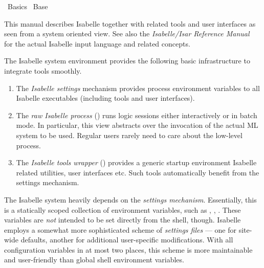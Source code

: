 %
\begin{isabellebody}%
\def\isabellecontext{Basics}%
%
\isadelimtheory
%
\endisadelimtheory
%
\isatagtheory
{}\isamarkupfalse%
\ Basics\isanewline
{}\ Base\isanewline
{}%
\endisatagtheory
{\isafoldtheory}%
%
\isadelimtheory
%
\endisadelimtheory
%
\isamarkuptrue%
%
\begin{isamarkuptext}%
This manual describes Isabelle together with related tools and user
  interfaces as seen from a system oriented view.  See also the
  \emph{Isabelle/Isar Reference Manual}~\cite{isabelle-isar-ref} for
  the actual Isabelle input language and related concepts.

  \medskip The Isabelle system environment provides the following
  basic infrastructure to integrate tools smoothly.

  \begin{enumerate}

  \item The \emph{Isabelle settings} mechanism provides process
  environment variables to all Isabelle executables (including tools
  and user interfaces).

  \item The \emph{raw Isabelle process} (\hyperlink{executable.isabelle-process}{\mbox{}}) runs logic sessions either interactively or in
  batch mode.  In particular, this view abstracts over the invocation
  of the actual ML system to be used.  Regular users rarely need to
  care about the low-level process.

  \item The \emph{Isabelle tools wrapper} (\hyperlink{executable.isabelle}{\mbox{}})
  provides a generic startup environment Isabelle related utilities,
  user interfaces etc.  Such tools automatically benefit from the
  settings mechanism.

  \end{enumerate}%
\end{isamarkuptext}%
\isamarkuptrue%
%
\isamarkuptrue%
%
\begin{isamarkuptext}%
The Isabelle system heavily depends on the \emph{settings
  mechanism}.  Essentially, this is a statically
  scoped collection of environment variables, such as \hyperlink{setting.ISABELLE-HOME}{\mbox{}}, \hyperlink{setting.ML-SYSTEM}{\mbox{}}, \hyperlink{setting.ML-HOME}{\mbox{}}.  These
  variables are \emph{not} intended to be set directly from the shell,
  though.  Isabelle employs a somewhat more sophisticated scheme of
  \emph{settings files} --- one for site-wide defaults, another for
  additional user-specific modifications.  With all configuration
  variables in at most two places, this scheme is more maintainable
  and user-friendly than global shell environment variables.


\end{isamarkuptext}
\end{isabellebody}
